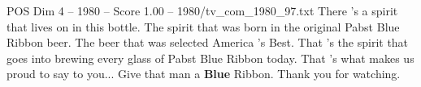 \begin{textsample}{POS Dim 4 – 1980 – Score 1.00 – 1980/tv\_com\_1980\_97.txt}  \label{ex:f4_pos_069}
There 's a spirit that lives on in this bottle.
The spirit that was born in the original Pabst Blue Ribbon beer.
The beer that was selected America 's Best.
That 's the spirit that goes into brewing every glass of Pabst Blue Ribbon today.
That 's what makes us proud to say to you...
Give that man a \textbf{Blue} Ribbon.
Thank you for watching.

\end{textsample}
